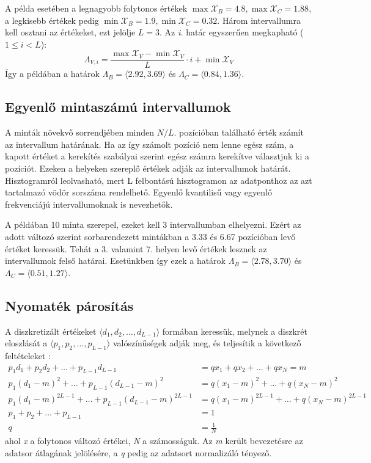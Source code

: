 A példa esetében a legnagyobb folytonos értékek $\max \mathcal{X}_{B} = 4.8, \max \mathcal{X}_{C} = 1.88$, a legkisebb értékek pedig $\min \mathcal{X}_{B} = 1.9, \min \mathcal{X}_{C} = 0.32$. Három intervallumra kell osztani az értékeket, ezt jelölje $L=3$. Az \emph{i.} határ egyszerűen megkapható ($1 \leq i < L$):
$$ \Lambda_{V, i} = \frac{\max \mathcal{X}_{V} - \min \mathcal{X}_{V}}{L} \cdot i + \min \mathcal{X}_{V} $$
Így a példában a határok $\Lambda_{B} = \langle 2.92, 3.69 \rangle$ és  $\Lambda_{C} = \langle 0.84, 1.36 \rangle$.

\subsection{Egyenlő mintaszámú intervallumok}
A minták növekvő sorrendjében minden $N / L$. pozícióban található érték számít az intervallum határának. Ha az így számolt pozíció nem lenne egész szám, a kapott értéket a kerekítés szabályai szerint egész számra kerekítve választjuk ki a pozíciót. Ezeken a helyeken szereplő értékek adják az intervallumok határát. Hisztogramról leolvasható, mert L felbontású hisztogramon az adatponthoz az azt tartalmazó vödör sorszáma rendelhető. Egyenlő kvantilisű vagy egyenlő frekvenciájú intervallumoknak is nevezhetők.

A példában 10 minta szerepel, ezeket kell 3 intervallumban elhelyezni. Ezért az adott változó szerint sorbarendezett mintákban a 3.33 és 6.67 pozícióban levő értéket keressük. Tehát a 3. valamint 7. helyen levő értékek lesznek az intervallumok felső határai. Esetünkben így ezek a határok $\Lambda_{B} = \langle 2.78, 3.70 \rangle$ és  $\Lambda_{C} = \langle 0.51, 1.27 \rangle$.

\subsection{Nyomaték párosítás}
A diszkretizált értékeket $\langle d_{1}, d_{2}, \dots, d_{L-1}\rangle$ formában keressük, melynek a diszkrét eloszlását a $\langle p_{1}, p_{2}, \dots, p_{L-1}\rangle$ valószínűségek adják meg, és teljesítik a következő feltételeket \cite{nojavan2017comparative}:
\begin{align}
    p_{1}d_{1} + p_{2}d_{2} + \dots + p_{L-1}d_{L-1} &= q x_{1} + q x_{2} + \dots + q x_{N} = m \\
    p_{1}(d_{1} - m)^{2} + \dots + p_{L-1}(d_{L-1} - m)^{2} &= q(x_{1} - m)^{2} + \dots + q(x_{N} - m)^{2} \\
    p_{1}(d_{1} - m)^{2L-1} + \dots + p_{L-1}(d_{L-1} - m)^{2L-1} &= q(x_{1} - m)^{2L-1} + \dots + q(x_{N} - m)^{2L-1} \\
    p_{1} + p_{2} + \dots + p_{L-1} &= 1 \\
    q &= \frac{1}{N}
\end{align}
ahol \emph{x} a folytonos változó értékei, \emph{N} a számosságuk. Az \emph{m} került bevezetésre az adatsor átlagának jelölésére, a \emph{q} pedig az adatsort normalizáló tényező.

